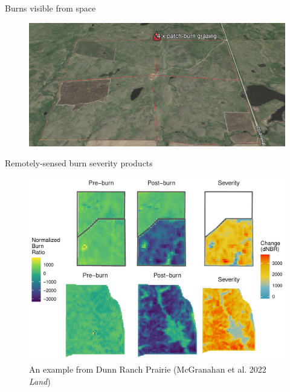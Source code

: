 \documentclass[11pt]{beamer}
\begin{document}
\begin{frame}{Burns visible from space}
	\begin{center}
		\begin{figure}
			\includegraphics[width=1\linewidth]{figs/BobSWBurnedOutline2} 
		\end{figure}
	\end{center}
\end{frame}

\begin{frame}{Remotely-sensed burn severity products}
	\begin{center}
		\begin{figure}
			\includegraphics[width=1\linewidth]{figs/severity_gg-1} 
			\caption{An example from Dunn Ranch Prairie (McGranahan et al. 2022 \emph{Land})}
		\end{figure}
	\end{center}
\end{frame}
\end{document}
